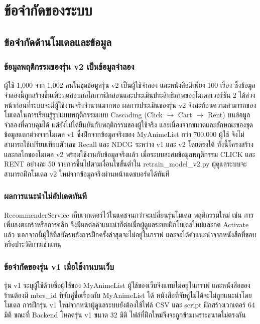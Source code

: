 \section{ข้อจำกัดของระบบ}

\subsection{ข้อจำกัดด้านโมเดลและข้อมูล}

\subsubsection{ข้อมูลพฤติกรรมของรุ่น v2 เป็นข้อมูลจำลอง}
ผู้ใช้ 1,000 จาก 1,002 คนในชุดข้อมูลรุ่น v2 เป็นผู้ใช้จำลอง และหนังสือมีเพียง 100 เรื่อง ซึ่งข้อมูลจำลองนี้ถูกสร้างขึ้นเพื่อทดสอบกลไกการฝึกสอนและประเมินประสิทธิภาพของโมเดลเวอร์ชัน 2 ได้ล่วงหน้าก่อนที่ระบบจะมีผู้ใช้งานจริงจำนวนมากพอ ผลการประเมินของรุ่น v2 จึงสะท้อนความสามารถของโมเดลในการเรียนรู้รูปแบบพฤติกรรมแบบ Cascading (Click $\to$ Cart $\to$ Rent) บนข้อมูลจำลองที่ควบคุมได้ แต่ยังไม่ได้ยืนยันกับพฤติกรรมของผู้ใช้จริง และเนื่องจากขนาดและลักษณะของชุดข้อมูลแตกต่างจากโมเดล v1 ซึ่งฝึกจากข้อมูลจริงของ MyAnimeList กว่า 700,000 ผู้ใช้ จึงไม่สามารถใช้เปรียบเทียบตัวเลข Recall และ NDCG ระหว่าง v1 และ v2 โดยตรงได้ ทั้งนี้โครงสร้างและกลไกของโมเดล v2 พร้อมใช้งานกับข้อมูลจริงแล้ว เมื่อระบบสะสมข้อมูลพฤติกรรม CLICK และ RENT อย่างละ 50 รายการขึ้นไปตามเงื่อนไขขั้นต่ำใน retrain\_model\_v2.py ผู้ดูแลระบบจะสามารถฝึกโมเดล v2 ใหม่จากข้อมูลจริงผ่านหน้าแดชบอร์ดได้ทันที

\subsubsection{ผลการแนะนำไม่อัปเดตทันที}
RecommenderService เก็บเวกเตอร์ไว้ในแคชจนกว่าจะเปลี่ยนรุ่นโมเดล พฤติกรรมใหม่ เช่น การเพิ่มลงตะกร้าหรือการคลิก จึงมีผลต่อคำแนะนำก็ต่อเมื่อผู้ดูแลระบบฝึกโมเดลใหม่และกด Activate แล้ว นอกจากนี้ผู้ใช้ที่สมัครหลังการฝึกครั้งล่าสุดจะไม่อยู่ในกราฟ และจะได้คำแนะนำจากหนังสือที่ชอบหรือประวัติการเช่าแทน

\subsubsection{ข้อจำกัดของรุ่น v1 เมื่อใช้งานบนเว็บ}
รุ่น v1 ระบุผู้ใช้ด้วยชื่อผู้ใช้ของ MyAnimeList ผู้ใช้ของเว็บจึงแทบไม่อยู่ในกราฟ และหนังสือของร้านต้องมี mbrs\_id ที่จับคู่ชื่อเรื่องกับ MyAnimeList ได้ หนังสือที่จับคู่ไม่ได้จะไม่ถูกแนะนำโดยโมเดล การฝึกรุ่น v1 ใหม่จากหน้าผู้ดูแลระบบยังต้องใช้ไฟล์ CSV และ script ฝึกสร้างเวกเตอร์ 64 มิติ ขณะที่ Backend โหลดรุ่น v1 ขนาด 32 มิติ ไฟล์ที่ฝึกใหม่จึงจะถูกข้ามเพราะขนาดไม่ตรงกัน

